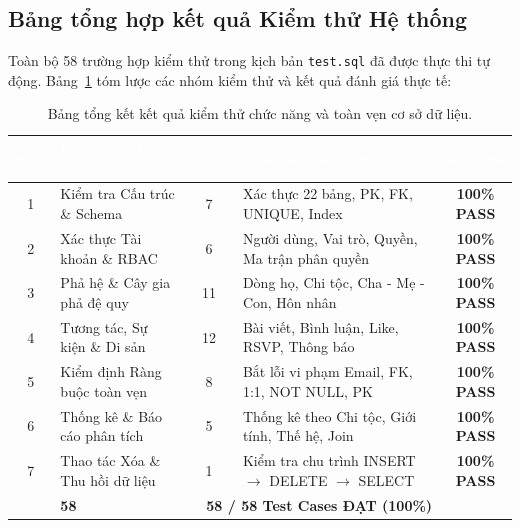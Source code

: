 \subsection{Bảng tổng hợp kết quả Kiểm thử Hệ thống}

Toàn bộ 58 trường hợp kiểm thử trong kịch bản \texttt{test.sql} đã được thực thi tự động. Bảng~\ref{tab:test_summary} tóm lược các nhóm kiểm thử và kết quả đánh giá thực tế:

\begin{table}[htbp]
\centering
\small
\renewcommand{\arraystretch}{1.25}
\begin{tabular}{|c|p{4.2cm}|c|p{5.0cm}|c|}
\hline
\rowcolor{tableheader}
\textcolor{white}{\textbf{STT}} &
\textcolor{white}{\textbf{Hạng mục kiểm thử}} &
\textcolor{white}{\textbf{Số Test}} &
\textcolor{white}{\textbf{Mục tiêu xác thực}} &
\textcolor{white}{\textbf{Kết quả}} \\
\hline
1 & Kiểm tra Cấu trúc \& Schema & 7 & Xác thực 22 bảng, PK, FK, UNIQUE, Index & \textbf{100\% PASS} \\
\hline
\rowcolor{tablerowalt}
2 & Xác thực Tài khoản \& RBAC & 6 & Người dùng, Vai trò, Quyền, Ma trận phân quyền & \textbf{100\% PASS} \\
\hline
3 & Phả hệ \& Cây gia phả đệ quy & 11 & Dòng họ, Chi tộc, Cha - Mẹ - Con, Hôn nhân & \textbf{100\% PASS} \\
\hline
\rowcolor{tablerowalt}
4 & Tương tác, Sự kiện \& Di sản & 12 & Bài viết, Bình luận, Like, RSVP, Thông báo & \textbf{100\% PASS} \\
\hline
5 & Kiểm định Ràng buộc toàn vẹn & 8 & Bắt lỗi vi phạm Email, FK, 1:1, NOT NULL, PK & \textbf{100\% PASS} \\
\hline
\rowcolor{tablerowalt}
6 & Thống kê \& Báo cáo phân tích & 5 & Thống kê theo Chi tộc, Giới tính, Thế hệ, Join & \textbf{100\% PASS} \\
\hline
7 & Thao tác Xóa \& Thu hồi dữ liệu & 1 & Kiểm tra chu trình INSERT $\to$ DELETE $\to$ SELECT & \textbf{100\% PASS} \\
\hline
\rowcolor{softblue}
\multicolumn{2}{|c|}{\textbf{TỔNG CỘNG}} & \textbf{58} & \multicolumn{2}{r|}{\textbf{58 / 58 Test Cases ĐẠT (100\%)}} \\
\hline
\end{tabular}
\caption{Bảng tổng kết kết quả kiểm thử chức năng và toàn vẹn cơ sở dữ liệu.}
\label{tab:test_summary}
\end{table}
